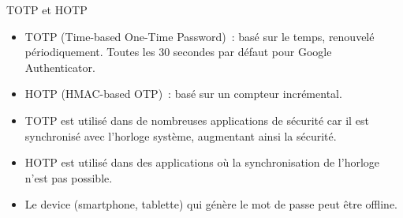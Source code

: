 \documentclass{beamer}
\begin{document}
    \begin{frame}{TOTP et HOTP}
        \begin{itemize}
            \item TOTP (Time-based One-Time Password)~: basé sur le temps, renouvelé périodiquement.
            Toutes les 30 secondes par défaut pour Google Authenticator.
            \item HOTP (HMAC-based OTP)~: basé sur un compteur incrémental.
            \item TOTP est utilisé dans de nombreuses applications de sécurité car il est synchronisé avec l'horloge système, augmentant ainsi la sécurité.
            \item HOTP est utilisé dans des applications où la synchronisation de l'horloge n'est pas possible.
            \item Le device (smartphone, tablette) qui génère le mot de passe peut être offline.
        \end{itemize}
    \end{frame}
\end{document}
